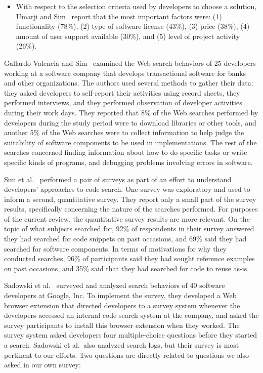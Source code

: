 \documentclass{casicswhitepaper}
\begin{document}
\begin{itemize}
\item With respect to the selection criteria used by developers to choose a solution, Umarji and Sim~\cite{umarji_2013} report that the most important factors were: (1) functionality (78\%), (2) type of software license (43\%), (3) price (38\%), (4) amount of user support available (30\%), and (5) level of project activity (26\%).

\end{itemize}

Gallardo-Valencia and Sim~\cite{gallardo2011kinds} examined the Web search behaviors of 25 developers working at a software company that develops transactional software for banks and other organizations.  The authors used several methods to gather their data: they asked developers to self-report their activities using record sheets, they performed interviews, and they performed observation of developer activities during their work days.  They reported that 8\% of the Web searches performed by developers during the study period were to download libraries or other tools, and another 5\% of the Web searches were to collect information to help judge the suitability of software components to be used in implementations.  The rest of the searches concerned finding information about how to do specific tasks or write specific kinds of programs, and debugging problems involving errors in software.

Sim et al.~\cite{sim2012software} performed a pair of surveys as part of an effort to understand developers' approaches to code search.  One survey was exploratory and used to inform a second, quantitative survey.  They report only a small part of the survey results, specifically concerning the nature of the searches performed.  For purposes of the current review, the quantitative survey results are more relevant.  On the topic of what subjects searched for, 92\% of respondents in their survey answered they had searched for code snippets on past occasions, and 69\% said they had searched for software components.  In terms of motivations for why they conducted searches, 96\% of participants said they had sought reference examples on past occasions, and 35\% said that they had searched for code to reuse as-is.

Sadowski et al.~\cite{sadowski2015developers} surveyed and analyzed search behaviors of 40 software developers at Google, Inc.  To  implement the survey, they developed a Web browser extension that directed developers to a survey system whenever the developers accessed an internal code search system at the company, and asked the survey participants to install this browser extension when they worked.  The survey system asked developers four multiple-choice questions before they started a search.  Sadowski et al.\ also analyzed search logs, but their survey is most pertinent to our efforts.  Two questions are directly related to questions we also asked in our own survey:
\end{document}
